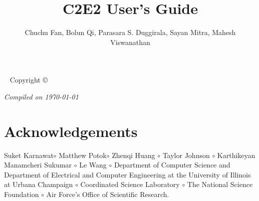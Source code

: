 \documentclass{tufte-book} %
\title{C2E2 User's Guide} %
\author{Chuchu Fan, Bolun Qi, Parasara S. Duggirala, Sayan Mitra, Mahesh Viswanathan} %
\newcommand{\openepigraph}[2]{ %
\begin{fullwidth}
\sffamily\large
\begin{doublespace}
\noindent\allcaps{#1}\\ %
\noindent\allcaps{#2} %
\end{doublespace}
\end{fullwidth}
}
\begin{document}
\frontmatter





\maketitle %


\newpage
\begin{fullwidth}
~\vfill
\thispagestyle{empty}
\setlength{\parindent}{0pt}
\setlength{\parskip}{\baselineskip}
Copyright \copyright\ \the\year\ \thanklessauthor




\par\textit{Compiled on \today}
\end{fullwidth}


\tableofcontents %





\mainmatter

\chapter{Acknowledgements}
\label{sec:ack}
Suket Karnawat$\circ$
Matthew Potok$\circ$
Zhenqi Huang $\circ$
Taylor Johnson $\circ$ 
Karthikeyan Manamcheri Sukumar $\circ$
Le Wang $\circ$
Department of Computer Science and Department of Electrical and Computer Engineering at the University of Illinois at Urbana Champaign $\circ$
Coordinated Science Laboratory $\circ$
The National Science Foundation $\circ$ 
Air Force's Office of Scientific Research.
\end{document}
